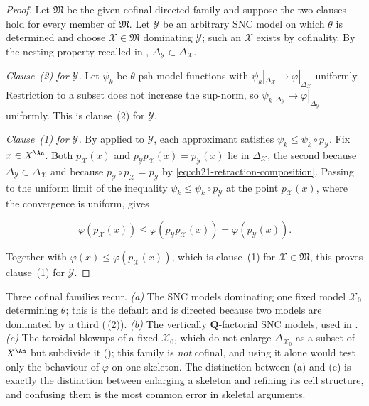 \begin{proof}
Let $\mathfrak M$ be the given cofinal directed family and suppose the two
clauses hold for every member of $\mathfrak M$.  Let $\mathcal Y$ be an
arbitrary SNC model on which $\theta$ is determined and choose
$\mathcal X\in\mathfrak M$ dominating $\mathcal Y$; such an
$\mathcal X$ exists by cofinality.  By the nesting property recalled in
, $\Delta_{\mathcal Y}\subset\Delta_{\mathcal X}$.

\emph{Clause~(2) for $\mathcal Y$.}  Let $\psi_k$ be $\theta$-psh
model functions with
$\psi_k|_{\Delta_{\mathcal X}}\to\varphi|_{\Delta_{\mathcal X}}$
uniformly.  Restriction to a subset does not increase the sup-norm, so
$\psi_k|_{\Delta_{\mathcal Y}}\to\varphi|_{\Delta_{\mathcal Y}}$
uniformly.  This is clause~(2) for $\mathcal Y$.

\emph{Clause~(1) for $\mathcal Y$.}  By
 applied to $\mathcal Y$, each
approximant satisfies $\psi_k\leq\psi_k\circ p_{\mathcal Y}$.  Fix
$x\in X^{\An}$.  Both $p_{\mathcal X}(x)$ and
$p_{\mathcal Y}p_{\mathcal X}(x)=p_{\mathcal Y}(x)$ lie in
$\Delta_{\mathcal X}$, the second because
$\Delta_{\mathcal Y}\subset\Delta_{\mathcal X}$ and because
$p_{\mathcal Y}\circ p_{\mathcal X}=p_{\mathcal Y}$ by
\eqref{eq:ch21-retraction-composition}.  Passing to the uniform limit of the
inequality $\psi_k\leq\psi_k\circ p_{\mathcal Y}$ at the point
$p_{\mathcal X}(x)$, where the convergence is uniform, gives

\begin{equation}
\label{eq:ch21-cofinal-retractions}
 \varphi(p_{\mathcal X}(x))
 \leq
 \varphi(p_{\mathcal Y}p_{\mathcal X}(x))
 =\varphi(p_{\mathcal Y}(x)).
\end{equation}

Together with $\varphi(x)\leq\varphi(p_{\mathcal X}(x))$, which is
clause~(1) for $\mathcal X\in\mathfrak M$, this proves
clause~(1) for $\mathcal Y$.
\end{proof}

\begin{remark}
\label{rem:ch21-cofinal-families}
Three cofinal families recur.  \emph{(a)} The SNC models dominating one
fixed model $\mathcal X_0$ determining $\theta$; this is the default and
is directed because two models are dominated by a third
(\,(2)).  \emph{(b)} The vertically
$\mathbf Q$-factorial SNC models, used in
.  \emph{(c)} The toroidal blowups of a fixed
$\mathcal X_0$, which do not enlarge $\Delta_{\mathcal X_0}$ as a subset
of $X^{\An}$ but subdivide it (); this
family is \emph{not} cofinal, and using it alone would test only the
behaviour of $\varphi$ on one skeleton.  The distinction between (a) and
(c) is exactly the distinction between enlarging a skeleton and refining
its cell structure, and confusing them is the most common error in
skeletal arguments.
\end{remark}

